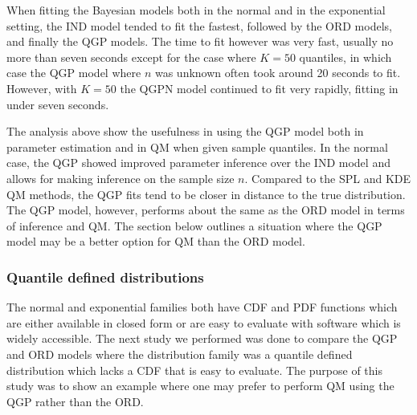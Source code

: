 \documentclass[preprint,12pt,authoryear]{elsarticle}
\begin{document}





When fitting the Bayesian models both in the normal and in the exponential setting, the IND model tended to fit the fastest, followed by the ORD models, and finally the QGP models. The time to fit however was very fast, usually no more than seven seconds except for the case where $K = 50$ quantiles, in which case the QGP model where $n$ was unknown often took around 20 seconds to fit. However, with $K= 50$ the QGPN model continued to fit very rapidly, fitting in under seven seconds.

The analysis above show the usefulness in using the QGP model both in parameter estimation and in QM when given sample quantiles. In the normal case, the QGP showed improved parameter inference over the IND model and allows for making inference on the sample size $n$. Compared to the SPL and KDE QM methods, the QGP fits tend to be closer in distance to the true distribution. The QGP model, however, performs about the same as the ORD model in terms of inference and QM. The section below outlines a situation where the QGP model may be a better option for QM than the ORD model. 


\subsubsection{Quantile defined distributions}
The normal and exponential families both have CDF and PDF functions which are either available in closed form or are easy to evaluate with software which is widely accessible. The next study we performed was done to compare the QGP and ORD models where the distribution family was a quantile defined distribution which lacks a CDF that is easy to evaluate. The purpose of this study was to show an example where one may prefer to perform QM using the QGP rather than the ORD.
\end{document}
